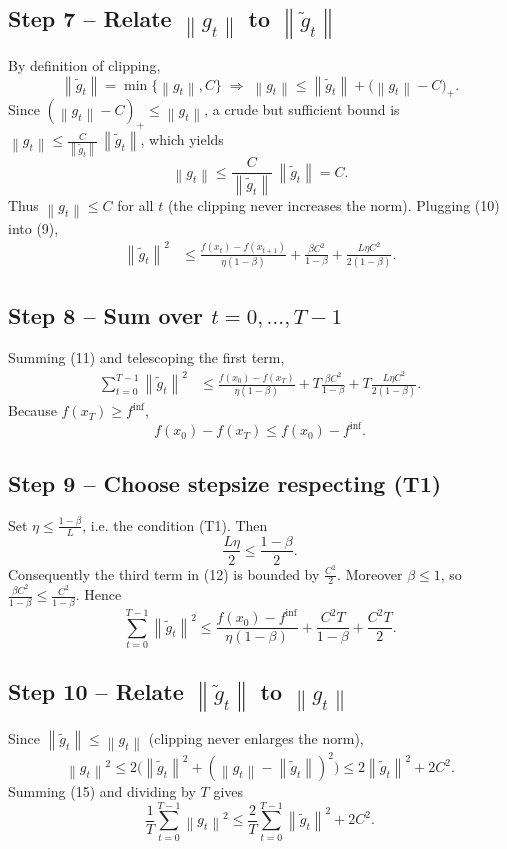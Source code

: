 \documentclass{article}
\newcommand{\norm}[1]{\left\lVert#1\right\rVert}
\begin{document}
\subsection*{Step 7 – Relate $\norm{g_t}$ to $\norm{\tilde g_t}$}
By definition of clipping,
\[
\norm{\tilde g_t}
   =\min\{\norm{g_t},C\}
   \;\Longrightarrow\;
   \norm{g_t}\le \norm{\tilde g_t}+ \bigl(\norm{g_t}-C\bigr)_+ .
\]
Since $(\norm{g_t}-C)_+\le \norm{g_t}$, a crude but sufficient bound is $\norm{g_t}\le \frac{C}{\norm{\tilde g_t}}\,\norm{\tilde g_t}$, which yields 
\[
\norm{g_t}\le \frac{C}{\norm{\tilde g_t}}\,\norm{\tilde g_t}=C . \tag{10}
\]
Thus $\norm{g_t}\le C$ for all $t$ (the clipping never increases the norm). Plugging (10) into (9),
\begin{align}
    \norm{\tilde g_t}^2
    &\le \frac{f(x_t)-f(x_{t+1})}{\eta(1-\beta)}
       +\frac{\beta C^2}{1-\beta}
       +\frac{L\eta C^2}{2(1-\beta)} . \tag{11}
\end{align}

\subsection*{Step 8 – Sum over $t=0,\dots,T-1$}
Summing (11) and telescoping the first term,
\begin{align}
    \sum_{t=0}^{T-1}\norm{\tilde g_t}^2
    &\le \frac{f(x_0)-f(x_T)}{\eta(1-\beta)}
       + T\frac{\beta C^2}{1-\beta}
       + T\frac{L\eta C^2}{2(1-\beta)} . \tag{12}
\end{align}
Because $f(x_T)\ge f^{\inf}$,
\[
f(x_0)-f(x_T)\le f(x_0)-f^{\inf}. \tag{13}
\]

\subsection*{Step 9 – Choose stepsize respecting (T1)}
Set $\eta\le \frac{1-\beta}{L}$, i.e. the condition (T1). Then
\[
\frac{L\eta}{2}\le \frac{1-\beta}{2}.
\]
Consequently the third term in (12) is bounded by $\frac{C^2}{2}$. Moreover $\beta\le 1$, so $\frac{\beta C^2}{1-\beta}\le \frac{C^2}{1-\beta}$. Hence
\[
\sum_{t=0}^{T-1}\norm{\tilde g_t}^2
\le \frac{f(x_0)-f^{\inf}}{\eta(1-\beta)} + \frac{C^2 T}{1-\beta}
    + \frac{C^2 T}{2} . \tag{14}
\]

\subsection*{Step 10 – Relate $\norm{\tilde g_t}$ to $\norm{g_t}$}
Since $\norm{\tilde g_t}\le \norm{g_t}$ (clipping never enlarges the norm),
\[
\norm{g_t}^2\le 2\bigl(\norm{\tilde g_t}^2 + (\norm{g_t}-\norm{\tilde g_t})^2\bigr)
          \le 2\norm{\tilde g_t}^2 + 2C^2 . \tag{15}
\]
Summing (15) and dividing by $T$ gives
\[
\frac{1}{T}\sum_{t=0}^{T-1}\norm{g_t}^2
\le \frac{2}{T}\sum_{t=0}^{T-1}\norm{\tilde g_t}^2 + 2C^2 . \tag{16}
\]
\end{document}
